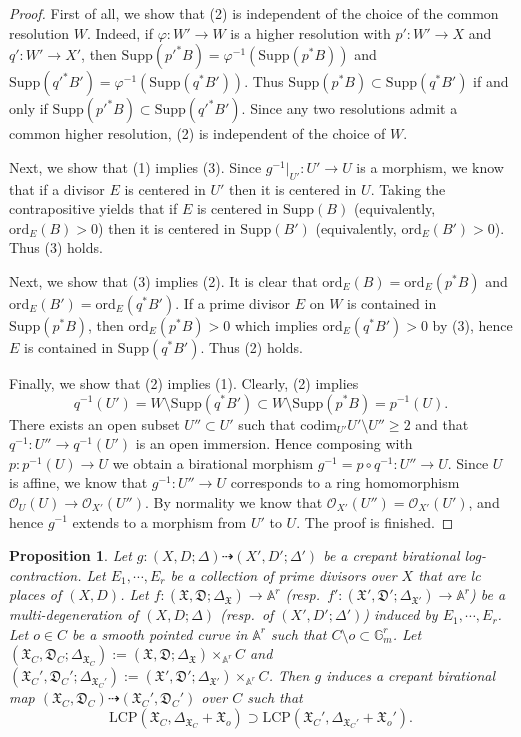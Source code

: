 \documentclass[reqno, 12pt]{amsart}
\newtheorem{prop}{Proposition}[section]
\theoremstyle{definition}
\newcommand{\bA}{\mathbb{A}}
\newcommand{\bG}{\mathbb{G}}
\newcommand{\cO}{\mathcal{O}}
\newcommand{\Supp}{\mathrm{Supp}}
\newcommand{\ord}{\mathrm{ord}}
\newcommand{\fX}{\mathfrak{X}}
\newcommand{\fD}{\mathfrak{D}}
\newcommand{\LCP}{\mathrm{LCP}}
\newcommand{\codim}{\mathrm{codim}}
\numberwithin{equation}{section}
\begin{document}
\begin{proof}
First of all, we show that (2) is independent of the choice of the common resolution $W$. Indeed, if $\varphi: W'\to W$ is a higher resolution with $p': W'\to X$ and $q': W'\to X'$, then $\Supp(p'^*B) = \varphi^{-1}(\Supp(p^*B)) $ and $\Supp(q'^*B') = \varphi^{-1}(\Supp(q^*B'))$. Thus $\Supp(p^*B)\subset \Supp(q^* B')$ if and only if $\Supp(p'^*B)\subset \Supp(q'^* B')$. Since any two resolutions admit a common higher resolution, (2) is independent of the choice of $W$. 

Next, we show that (1) implies (3). Since $g^{-1}|_{U'}:U'\to U$ is a morphism, we know that if a divisor $E$ is centered in $U'$ then it is centered in $U$. Taking the contrapositive yields that if $E$ is centered in $\Supp(B)$ (equivalently, $\ord_E(B)>0$) then it is centered in $\Supp(B')$ (equivalently, $\ord_E(B')>0$). Thus (3) holds.

Next, we show that (3) implies (2). It is clear that $\ord_E(B) = \ord_E(p^*B)$ and $\ord_E(B') = \ord_E(q^*B')$. If a prime divisor $E$ on $W$ is contained in $\Supp(p^*B)$, then $\ord_E(p^*B)>0$ which implies $\ord_E(q^*B')>0$ by (3), hence $E$ is contained in $\Supp(q^*B')$. Thus (2) holds.

Finally, we show that (2) implies (1). Clearly, (2) implies 
\[
q^{-1}(U') = W\setminus \Supp(q^*B') \subset  W\setminus \Supp(p^*B) = p^{-1}(U).  
\]
There exists an open subset $U''\subset U'$ such that $\codim_{U'} U'\setminus U''\geq 2$ and that $q^{-1}:U''\to q^{-1}(U')$ is an open immersion. Hence composing with $p:p^{-1}(U) \to U$ we obtain a birational morphism $g^{-1}= p\circ q^{-1}: U''\to U$. Since $U$ is affine, we know that $g^{-1}:U''\to U$ corresponds to a ring homomorphism $\cO_U(U)\to \cO_{X'}(U'')$. By normality we know that  $\cO_{X'}(U'')= \cO_{X'}(U')$, and hence $g^{-1}$ extends to a morphism from $U'$ to $U$. The proof is finished.
\end{proof}

\begin{prop}\label{prop:fg-lcp}
Let $g: (X,D;\Delta)\dashrightarrow (X', D';\Delta')$ be a crepant birational log-contraction. Let $E_1,\cdots, E_r$ be a collection of prime divisors over $X$ that are lc places of $(X,D)$. 
Let $f:(\fX,\fD;\Delta_{\fX})\to \bA^r$ (resp.\ $f':(\fX',\fD';\Delta_{\fX'})\to \bA^r$) be a multi-degeneration of $(X,D;\Delta)$ (resp.\ of $(X',D'; \Delta')$) induced by $E_1, \cdots, E_r$. 
Let $o\in C$ be a  smooth pointed curve in $\bA^r$ such that $C\setminus o\subset \bG_m^r$. Let
$(\fX_C,\fD_{C};\Delta_{\fX_C}):= (\fX, \fD;\Delta_{\fX})\times_{\bA^r} C$ and $(\fX_C',\fD_C';\Delta_{\fX_C'}):= (\fX', \fD';\Delta_{\fX'})\times_{\bA^r} C$.
Then $g$ induces a crepant birational map $(\fX_C,\fD_C)\dashrightarrow (\fX_C',\fD_C')$ over $C$ such that 
\[
\LCP(\fX_C, \Delta_{\fX_C}+ \fX_o) \supset \LCP(\fX_C', \Delta_{\fX_C'}+ \fX_o').
\]
\end{prop}
\end{document}
